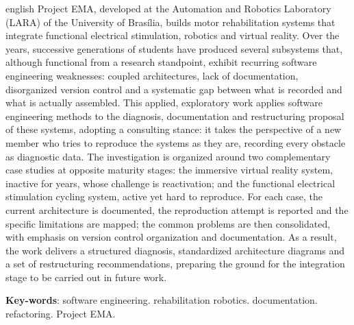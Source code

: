 \begin{resumo}[Abstract]
 \begin{otherlanguage*}{english}
   Project EMA, developed at the Automation and Robotics Laboratory (LARA) of the University
   of Brasília, builds motor rehabilitation systems that integrate functional electrical
   stimulation, robotics and virtual reality. Over the years, successive generations
   of students have produced several subsystems that, although functional from a research
   standpoint, exhibit recurring software engineering weaknesses: coupled architectures,
   lack of documentation, disorganized version control and a systematic gap between what is
   recorded and what is actually assembled. This applied, exploratory work applies software
   engineering methods to the diagnosis, documentation and restructuring proposal of these
   systems, adopting a consulting stance: it takes the perspective of a new member who tries
   to reproduce the systems as they are, recording every obstacle as diagnostic data. The
   investigation is organized around two complementary case studies at opposite maturity
   stages: the immersive virtual reality system, inactive for years, whose
   challenge is reactivation; and the functional electrical stimulation cycling system,
   active yet hard to reproduce. For each case, the current architecture is documented, the
   reproduction attempt is reported and the specific limitations are mapped; the common
   problems are then consolidated, with emphasis on version control organization and
   documentation. As a result, the work delivers a structured diagnosis, standardized
   architecture diagrams and a set of restructuring recommendations, preparing the ground
   for the integration stage to be carried out in future work.

   \vspace{\onelineskip}

   \noindent
   \textbf{Key-words}: software engineering. rehabilitation robotics. documentation. refactoring. Project EMA.
 \end{otherlanguage*}
\end{resumo}
